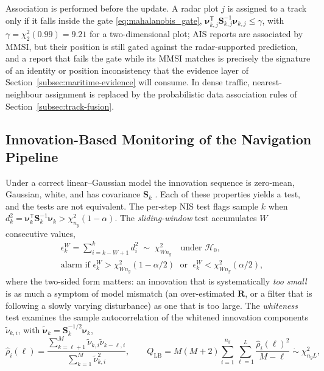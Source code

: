 Association is performed before the update. A radar plot $j$ is assigned to a track only if it falls inside the gate \eqref{eq:mahalanobis_gate}, $\boldsymbol{\nu}_{k,j}^{\mathsf T}\mathbf{S}_{k,j}^{-1}\boldsymbol{\nu}_{k,j}\le\gamma$, with $\gamma=\chi^{2}_{2}(0.99)=9.21$ for a two-dimensional plot; AIS reports are associated by MMSI, but their position is still gated against the radar-supported prediction, and a report that fails the gate while its MMSI matches is precisely the signature of an identity or position inconsistency that the evidence layer of Section~\ref{subsec:maritime-evidence} will consume. In dense traffic, nearest-neighbour assignment is replaced by the probabilistic data association rules of Section~\ref{subsec:track-fusion}.

\subsection{Innovation-Based Monitoring of the Navigation Pipeline}
\label{subsec:maritime-innovation-monitoring}
Under a correct linear--Gaussian model the innovation sequence is zero-mean, Gaussian, white, and has covariance $\mathbf{S}_k$ \cite{barshalom2001_estimation,mehra_identification_1970}. Each of these properties yields a test, and the tests are not equivalent. The per-step NIS test flags sample $k$ when $d_k^{2}=\boldsymbol{\nu}_k^{\mathsf T}\mathbf{S}_k^{-1}\boldsymbol{\nu}_k>\chi^{2}_{n_y}(1-\alpha)$. The \emph{sliding-window} test accumulates $W$ consecutive values,
\begin{equation}
\begin{aligned}
&\epsilon_{k}^{W}=\sum_{i=k-W+1}^{k} d_i^{2}\;\sim\;\chi^{2}_{W n_y}\quad\text{under } \mathcal{H}_0,\\
&\text{alarm if } \epsilon_{k}^{W}>\chi^{2}_{W n_y}(1-\alpha/2)\;\text{ or }\;\epsilon_{k}^{W}<\chi^{2}_{W n_y}(\alpha/2),
\end{aligned}
\label{eq:ch07-window-nis}
\end{equation}
where the two-sided form matters: an innovation that is systematically \emph{too small} is as much a symptom of model mismatch (an over-estimated $\mathbf{R}$, or a filter that is following a slowly varying disturbance) as one that is too large. The \emph{whiteness} test examines the sample autocorrelation of the whitened innovation components $\tilde{\nu}_{k,i}$, with $\tilde{\boldsymbol{\nu}}_k=\mathbf{S}_k^{-1/2}\boldsymbol{\nu}_k$,
\begin{equation}
\hat\rho_{i}(\ell)=\frac{\sum_{k=\ell+1}^{M}\tilde{\nu}_{k,i}\tilde{\nu}_{k-\ell,i}}{\sum_{k=1}^{M}\tilde{\nu}_{k,i}^{2}},
\qquad
Q_{\mathrm{LB}}=M(M+2)\sum_{i=1}^{n_y}\sum_{\ell=1}^{L}\frac{\hat\rho_{i}(\ell)^{2}}{M-\ell}\;\dot\sim\;\chi^{2}_{n_y L},
\label{eq:ch07-ljung-box}
\end{equation}
